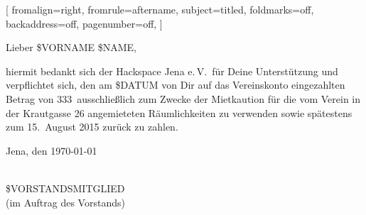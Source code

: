 \documentclass[headsepline=on]{scrlttr2}
\begin{document}
\begin{letter}[
		fromalign=right,
		fromrule=aftername,
		subject=titled,
		foldmarks=off,
		backaddress=off,
		pagenumber=off,
	]{}

\opening{Lieber \$VORNAME \$NAME,}

hiermit bedankt sich der Hackspace Jena e.\,V.\ für Deine Unterstützung und
verpflichtet sich, den am \$DATUM von Dir auf das Vereinskonto eingezahlten
Betrag von 333\EURcr\ ausschließlich zum Zwecke der Mietkaution für die vom
Verein in der Krautgasse 26 angemieteten Räumlichkeiten zu verwenden sowie
spätestens zum 15.~August 2015 zurück zu zahlen.

\vspace{8ex}
\hspace*{\fill}
\begin{minipage}{.382\textwidth}
	Jena, den \today
	\bigskip\\
	\hspace*{1em}
	\smallskip\\
	\begin{center}
		\$VORSTANDSMITGLIED\\
		(im Auftrag des Vorstands)
	\end{center}
\end{minipage}

\end{letter}
\end{document}
